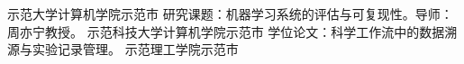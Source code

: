   {示范大学计算机学院}{示范市}{
  研究课题：机器学习系统的评估与可复现性。导师：周亦宁教授。
}
  {示范科技大学计算机学院}{示范市}{
  学位论文：科学工作流中的数据溯源与实验记录管理。
}
  {示范理工学院}{示范市}{}
